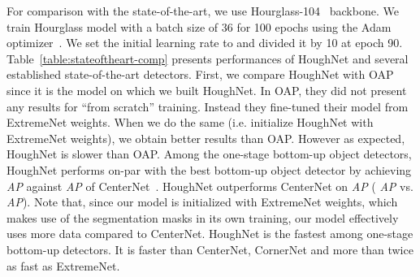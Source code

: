 \documentclass[runningheads]{llncs}
\begin{document}
For comparison with the state-of-the-art, we use Hourglass-104~\cite{cornernet} backbone. We train Hourglass model with a batch size of 36 for 100 epochs using the Adam optimizer~\cite{adam}. We set the initial learning rate to   and divided  it by  10 at epoch 90.  Table~\ref{table:stateoftheart-comp} presents performances of HoughNet and several established state-of-the-art detectors. First,  we compare HoughNet with OAP~\cite{centernet} since it is the model on which we built HoughNet. In OAP, they did not present any results for “from scratch” training.  Instead they fine-tuned their model from ExtremeNet weights. When we do the same (i.e. initialize HoughNet with ExtremeNet weights), we obtain better results than OAP. However as expected, HoughNet is slower than OAP. Among the one-stage bottom-up object detectors, HoughNet performs on-par with the best bottom-up object detector by achieving  \textit{AP} against  \textit{AP} of CenterNet~\cite{centernet2}. HoughNet outperforms CenterNet on \textit{AP} ( \textit{AP} vs.  \textit{AP}). Note that, since our model is initialized with ExtremeNet weights, which makes use of the segmentation masks in its own training, our model  effectively uses more data compared to CenterNet. HoughNet is the fastest among one-stage bottom-up detectors. It is faster than CenterNet, CornerNet and more than twice as fast as ExtremeNet.
\end{document}
